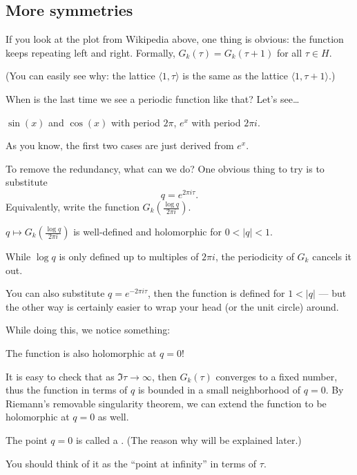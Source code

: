 \subsection{More symmetries}

If you look at the plot from Wikipedia above, one thing is obvious:
the function keeps repeating left and right.
Formally, $G_k(\tau) = G_k(\tau+1)$ for all $\tau \in H$.

(You can easily see why:
the lattice $\langle 1, \tau \rangle$ is the same as the lattice $\langle 1, \tau+1 \rangle$.)

When is the last time we see a periodic function like that? Let's see\dots
\begin{itemize}
	\ii $\sin(x)$ and $\cos(x)$ with period $2 \pi$,
	\ii $e^x$ with period $2 \pi i$.
\end{itemize}
As you know, the first two cases are just derived from $e^x$.

To remove the redundancy, what can we do? One obvious thing to try is to substitute
\[ q = e^{2 \pi i \tau}. \]
Equivalently, write the function $G_k(\frac{\log q}{2 \pi i})$.


\begin{claim}
	$q \mapsto G_k(\frac{\log q}{2 \pi i})$ is well-defined and holomorphic for $0<|q|<1$.
\end{claim}
While $\log q$ is only defined up to multiples of $2 \pi i$, the periodicity of $G_k$ cancels it
out.

\begin{remark}
	You can also substitute $q = e^{-2 \pi i \tau}$, then the function is defined for $1<|q|$ ---
	but the other way is certainly easier to wrap your head (or the unit circle) around.
\end{remark}

While doing this, we notice something:
\begin{moral}
	The function is also holomorphic at $q=0$!
\end{moral}

It is easy to check that as $\Im \tau \to \infty$, then $G_k(\tau)$ converges to a fixed number,
thus the function in terms of $q$ is bounded in a small neighborhood of $q=0$.
By Riemann's removable singularity theorem,
we can extend the function to be holomorphic at $q=0$ as well.

The point $q=0$ is called a . (The reason why will be explained later.) 
\begin{moral}
	You should think of it as the ``point at infinity'' in terms of $\tau$.
\end{moral}

